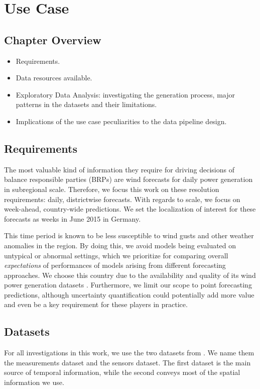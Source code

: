 \graphicspath{{./figures/usecase/}}

\chapter{Use Case}

\section*{Chapter Overview}
\begin{itemize}
    \item Requirements.
    \item Data resources available.
    \item Exploratory Data Analysis: investigating the generation process, major patterns in the datasets and their limitations.
    \item Implications of the use case peculiarities to the data pipeline design.
\end{itemize}
\pagebreak


\section{Requirements}\label{sec:reqs}
The most valuable kind of information they require for driving decisions of balance responsible parties (BRPs) are wind forecasts for daily power generation in subregional scale.
Therefore, we focus this work on these resolution requirements: daily, districtwise forecasts.
With regards to scale, we focus on week-ahead, country-wide predictions.
We set the localization of interest for these forecasts as weeks in June 2015 in Germany.

This time period is known to be less susceptible to wind gusts and other weather anomalies in the region.
By doing this, we avoid models being evaluated on untypical or abnormal settings, which we prioritize for comparing overall \textit{expectations} of performances of models arising from different forecasting approaches.
We choose this country due to the availability and quality of its wind power generation datasets \cite{becker2017completion}.
Furthermore, we limit our scope to point forecasting predictions, although uncertainty quantification could potentially add more value and even be a key requirement for these players in practice.


\section{Datasets}\label{sec:datasets}
For all investigations in this work, we use the two datasets from \cite{becker2017completion}.
We name them the measurements dataset and the sensors dataset.
The first dataset is the main source of temporal information, while the second conveys most of the spatial information we use.

